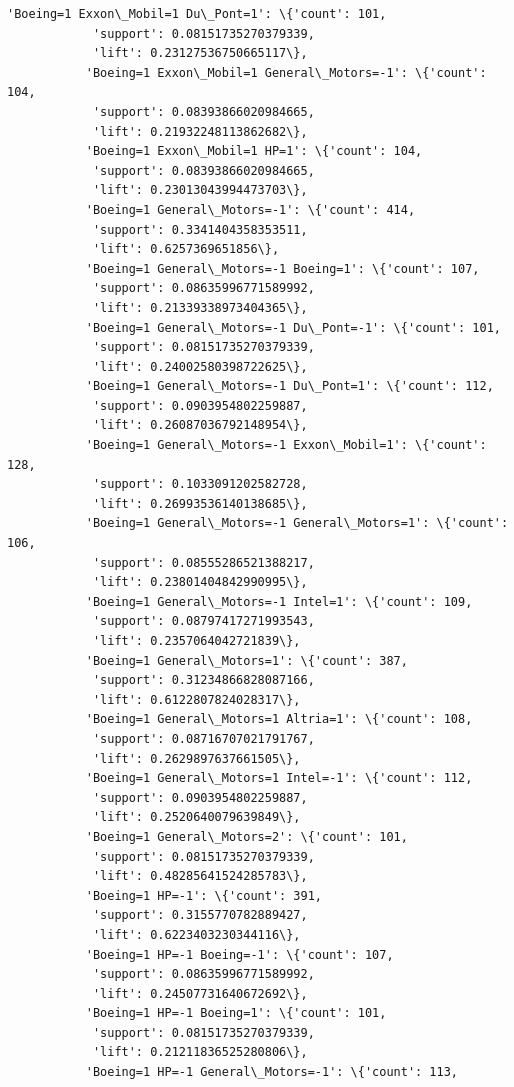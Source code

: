 \documentclass[11pt]{article}
\begin{document}
\begin{Verbatim}[commandchars=\\\{\}]
           'Boeing=1 Exxon\_Mobil=1 Du\_Pont=1': \{'count': 101,
            'support': 0.08151735270379339,
            'lift': 0.23127536750665117\},
           'Boeing=1 Exxon\_Mobil=1 General\_Motors=-1': \{'count': 104,
            'support': 0.08393866020984665,
            'lift': 0.21932248113862682\},
           'Boeing=1 Exxon\_Mobil=1 HP=1': \{'count': 104,
            'support': 0.08393866020984665,
            'lift': 0.23013043994473703\},
           'Boeing=1 General\_Motors=-1': \{'count': 414,
            'support': 0.3341404358353511,
            'lift': 0.6257369651856\},
           'Boeing=1 General\_Motors=-1 Boeing=1': \{'count': 107,
            'support': 0.08635996771589992,
            'lift': 0.21339338973404365\},
           'Boeing=1 General\_Motors=-1 Du\_Pont=-1': \{'count': 101,
            'support': 0.08151735270379339,
            'lift': 0.24002580398722625\},
           'Boeing=1 General\_Motors=-1 Du\_Pont=1': \{'count': 112,
            'support': 0.0903954802259887,
            'lift': 0.26087036792148954\},
           'Boeing=1 General\_Motors=-1 Exxon\_Mobil=1': \{'count': 128,
            'support': 0.1033091202582728,
            'lift': 0.26993536140138685\},
           'Boeing=1 General\_Motors=-1 General\_Motors=1': \{'count': 106,
            'support': 0.08555286521388217,
            'lift': 0.23801404842990995\},
           'Boeing=1 General\_Motors=-1 Intel=1': \{'count': 109,
            'support': 0.08797417271993543,
            'lift': 0.2357064042721839\},
           'Boeing=1 General\_Motors=1': \{'count': 387,
            'support': 0.31234866828087166,
            'lift': 0.6122807824028317\},
           'Boeing=1 General\_Motors=1 Altria=1': \{'count': 108,
            'support': 0.08716707021791767,
            'lift': 0.2629897637661505\},
           'Boeing=1 General\_Motors=1 Intel=-1': \{'count': 112,
            'support': 0.0903954802259887,
            'lift': 0.2520640079639849\},
           'Boeing=1 General\_Motors=2': \{'count': 101,
            'support': 0.08151735270379339,
            'lift': 0.48285641524285783\},
           'Boeing=1 HP=-1': \{'count': 391,
            'support': 0.3155770782889427,
            'lift': 0.6223403230344116\},
           'Boeing=1 HP=-1 Boeing=-1': \{'count': 107,
            'support': 0.08635996771589992,
            'lift': 0.24507731640672692\},
           'Boeing=1 HP=-1 Boeing=1': \{'count': 101,
            'support': 0.08151735270379339,
            'lift': 0.21211836525280806\},
           'Boeing=1 HP=-1 General\_Motors=-1': \{'count': 113,

\end{Verbatim}
\end{document}
